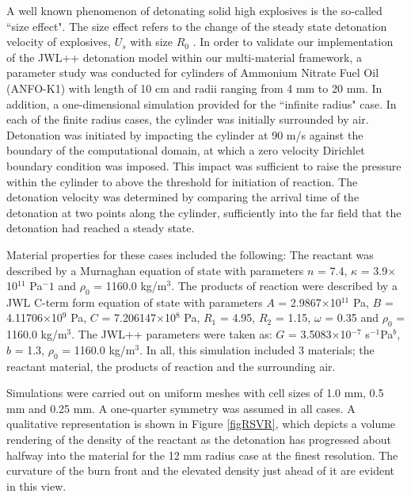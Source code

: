 A well known phenomenon of detonating solid high explosives is the 
so-called ``size effect".  The size effect refers to the change of the 
steady state detonation velocity of explosives, $U_s$ with size $R_0$
\cite{JWLpp}.  In order to validate our implementation of the JWL++ 
detonation model within our multi-material framework, a parameter study 
was conducted for cylinders of Ammonium Nitrate Fuel Oil (ANFO-K1) with 
length of 10 cm and radii ranging from 4 mm to 20 mm.  In addition, a 
one-dimensional simulation provided for the ``infinite radius" case.  In each of the finite radius 
cases, the cylinder was initially surrounded by air.  Detonation was 
initiated by impacting the cylinder at 90 m/s against the boundary of the 
computational domain, at which a zero velocity Dirichlet boundary condition 
was imposed.  This impact was sufficient to raise the pressure within the 
cylinder to above the threshold for initiation of reaction.  The detonation 
velocity was determined by comparing the arrival time of the detonation at 
two points along the cylinder, sufficiently into the far field that the
detonation had reached a steady state.

Material properties for these cases included the following:  The reactant was 
described by a Murnaghan equation of state with parameters $n$ = 7.4, 
$\kappa$ = 3.9$\times$10$^{11}$ Pa$^-1$ and $\rho_0$ = 1160.0 kg/m$^3$.  The products of 
reaction were described by a JWL C-term form  equation of state with parameters
$A$ = 2.9867$\times$10$^{11}$ Pa, $B$ = 4.11706$\times$10$^9$ Pa, $C$ = 7.206147$\times$10$^8$ Pa, $R_1$ = 4.95, 
$R_2$ = 1.15, $\omega$ = 0.35 and $\rho_0$ = 1160.0 kg/m$^3$.  The JWL++ parameters 
were taken as: $G$ = 3.5083$\times$10$^{-7}$ s$^{-1}$Pa$^b$, $b$ = 1.3, $\rho_0$ = 1160.0 kg/m$^3$.  
In all, this simulation included 3 materials; the reactant material, the 
products of reaction and the surrounding air.

Simulations were carried out on uniform meshes with cell sizes of 1.0 mm, 
0.5 mm and 0.25 mm.  A one-quarter symmetry was assumed in all cases.  A 
qualitative representation is shown in Figure \ref{figRSVR}, which depicts a 
volume rendering of the density of the reactant as the detonation has progressed
about halfway into the material for the 12 mm radius case at the finest 
resolution.  The curvature of the burn front and the elevated density just 
ahead of it are evident in this view.

